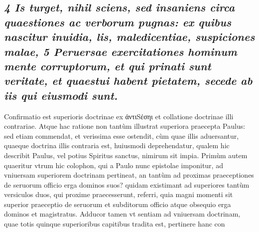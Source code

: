 \documentclass{article}
\begin{document}
\begin{pages}
\subsection*{\textit{4 Is turget, nihil sciens, sed insaniens circa quaestiones ac verborum pugnas: ex quibus nascitur inuidia, lis, maledicentiae, suspiciones malae, 5 Peruersae exercitationes hominum mente corruptorum, et qui prinati sunt veritate, et quaestui habent pietatem, secede ab iis qui eiusmodi sunt. }}\pstart Confirmatio est superioris doctrinae ex ἀντιSέσηι et collatione doctrinae illi contrariae. Atque hac ratione non tantùm illustrat superiora praecepta Paulus: sed etiam commendat, et verissima esse ostendit, cùm quae illis aduersantur, quaeque doctrina illis contraria est, huiusmodi deprehendatur, qualem hic describit Paulus, vel potius Spiritus sanctus, nimirum sit impia.  \pend\pstart Primùm autem quaeritur vtrum hic colophon, qui a Paulo nunc epistolae imponitur, ad vniuersam superiorem doctrinam pertineat, an tantùm ad proximas praeceptiones de seruorum officio erga dominos suos? quidam existimant ad superiores tantùm versiculos duos, qui proxime praecesserunt, referri, quia magni momenti sit superior praeceptio de seruorum et subditorum officio atque obsequio erga dominos et magistratus. Adducor tamen vt sentiam ad vniuersam doctrinam, quae totis quinque superioribus capitibus tradita est, pertinere hanc con\pend
{}
{}
\subsection*{\textit{}}

\end{pages}
\end{document}
